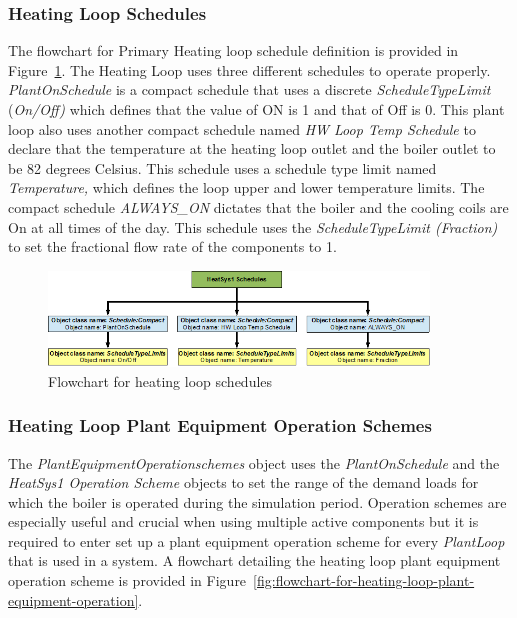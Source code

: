 \subsubsection{Heating Loop Schedules}\label{heating-loop-schedules}

The flowchart for Primary Heating loop schedule definition is provided in Figure~\ref{fig:flowchart-for-heating-loop-schedules}. The Heating Loop uses three different schedules to operate properly. \emph{PlantOnSchedule} is a compact schedule that uses a discrete \emph{ScheduleTypeLimit} (\emph{On/Off)} which defines that the value of ON is 1 and that of Off is 0. This plant loop also uses another compact schedule named \emph{HW Loop Temp Schedule} to declare that the temperature at the heating loop outlet and the boiler outlet to be 82 degrees Celsius. This schedule uses a schedule type limit named \emph{Temperature,} which defines the loop upper and lower temperature limits. The compact schedule \emph{ALWAYS\_ON} dictates that the boiler and the cooling coils are On at all times of the day. This schedule uses the \emph{ScheduleTypeLimit (Fraction)} to set the fractional flow rate of the components to 1.

\begin{figure}[hbtp] %
\centering
\includegraphics[width=0.9\textwidth, height=0.9\textheight, keepaspectratio=true]{media/image083.png}
\caption{Flowchart for heating loop schedules \protect \label{fig:flowchart-for-heating-loop-schedules}}
\end{figure}

\subsubsection{Heating Loop Plant Equipment Operation Schemes}\label{heating-loop-plant-equipment-operation-schemes}

The \emph{PlantEquipmentOperationschemes} object uses the \emph{PlantOnSchedule} and the \emph{HeatSys1 Operation Scheme} objects to set the range of the demand loads for which the boiler is operated during the simulation period. Operation schemes are especially useful and crucial when using multiple active components but it is required to enter set up a plant equipment operation scheme for every \emph{PlantLoop} that is used in a system. A flowchart detailing the heating loop plant equipment operation scheme is provided in Figure~\ref{fig:flowchart-for-heating-loop-plant-equipment-operation}.

